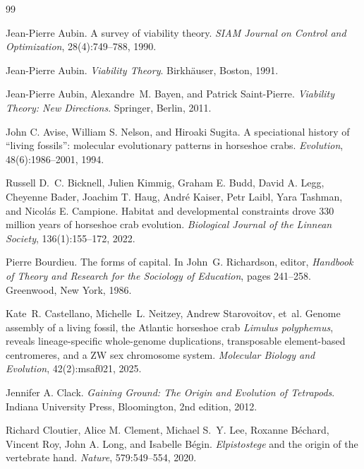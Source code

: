 \documentclass[11pt,a4paper]{article}
\theoremstyle{remark}
\begin{document}
\begin{thebibliography}{99}

Jean-Pierre Aubin.
\newblock A survey of viability theory.
\newblock \emph{SIAM Journal on Control and Optimization}, 28(4):749--788, 1990.

Jean-Pierre Aubin.
\newblock \emph{Viability Theory}.
\newblock Birkh\"auser, Boston, 1991.

Jean-Pierre Aubin, Alexandre~M. Bayen, and Patrick Saint-Pierre.
\newblock \emph{Viability Theory: New Directions}.
\newblock Springer, Berlin, 2011.

John C. Avise, William S. Nelson, and Hiroaki Sugita.
\newblock A speciational history of ``living fossils'': molecular evolutionary patterns in horseshoe crabs.
\newblock \emph{Evolution}, 48(6):1986--2001, 1994.

Russell D.~C. Bicknell, Julien Kimmig, Graham E. Budd, David A. Legg, Cheyenne Bader, Joachim T. Haug, Andr\'e Kaiser, Petr Laibl, Yara Tashman, and Nicol\'as E. Campione.
\newblock Habitat and developmental constraints drove 330 million years of horseshoe crab evolution.
\newblock \emph{Biological Journal of the Linnean Society}, 136(1):155--172, 2022.

Pierre Bourdieu.
\newblock The forms of capital.
\newblock In John~G. Richardson, editor, \emph{Handbook of Theory and Research for the Sociology of Education}, pages 241--258. Greenwood, New York, 1986.

Kate~R. Castellano, Michelle~L. Neitzey, Andrew Starovoitov, et~al.
\newblock Genome assembly of a living fossil, the Atlantic horseshoe crab \emph{Limulus polyphemus}, reveals lineage-specific whole-genome duplications, transposable element-based centromeres, and a ZW sex chromosome system.
\newblock \emph{Molecular Biology and Evolution}, 42(2):msaf021, 2025.

Jennifer A. Clack.
\newblock \emph{Gaining Ground: The Origin and Evolution of Tetrapods}.
\newblock Indiana University Press, Bloomington, 2nd edition, 2012.

Richard Cloutier, Alice M. Clement, Michael S.~Y. Lee, Roxanne B\'echard, Vincent Roy, John A. Long, and Isabelle B\'egin.
\newblock \emph{Elpistostege} and the origin of the vertebrate hand.
\newblock \emph{Nature}, 579:549--554, 2020.


\end{thebibliography}
\end{document}
